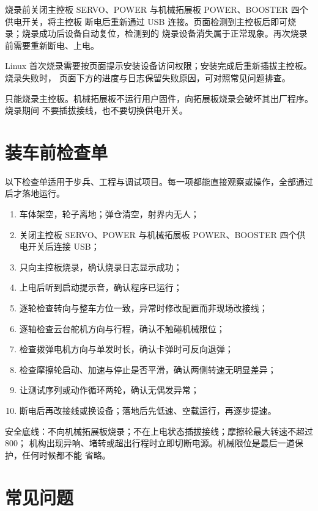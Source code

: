 烧录前关闭主控板 SERVO、POWER 与机械拓展板 POWER、BOOSTER 四个供电开关，将主控板
断电后重新通过 USB 连接。页面检测到主控板后即可烧录；烧录成功后设备自动复位，检测到的
烧录设备消失属于正常现象。再次烧录前需要重新断电、上电。

Linux 首次烧录需要按页面提示安装设备访问权限；安装完成后重新插拔主控板。烧录失败时，
页面下方的进度与日志保留失败原因，可对照常见问题排查。

\begin{note}
只能烧录主控板。机械拓展板不运行用户固件，向拓展板烧录会破坏其出厂程序。烧录期间
不要插拔接线，也不要切换供电开关。
\end{note}

\section{装车前检查单}

以下检查单适用于步兵、工程与调试项目。每一项都能直接观察或操作，全部通过后才落地运行。

\begin{enumerate}
  \item 车体架空，轮子离地；弹仓清空，射界内无人；
  \item 关闭主控板 SERVO、POWER 与机械拓展板 POWER、BOOSTER 四个供电开关后连接 USB；
  \item 只向主控板烧录，确认烧录日志显示成功；
  \item 上电后听到启动提示音，确认程序已运行；
  \item 逐轮检查转向与整车方位一致，异常时修改配置而非现场改接线；
  \item 逐轴检查云台舵机方向与行程，确认不触碰机械限位；
  \item 检查拨弹电机方向与单发时长，确认卡弹时可反向退弹；
  \item 检查摩擦轮启动、加速与停止是否平滑，确认两侧转速无明显差异；
  \item 让测试序列或动作循环两轮，确认无偶发异常；
  \item 断电后再改接线或换设备；落地后先低速、空载运行，再逐步提速。
\end{enumerate}

\begin{note}
安全底线：不向机械拓展板烧录；不在上电状态插拔接线；摩擦轮最大转速不超过 800；
机构出现异响、堵转或超出行程时立即切断电源。机械限位是最后一道保护，任何时候都不能
省略。
\end{note}

\section{常见问题}

